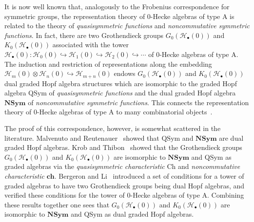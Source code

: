 \documentclass{amsart}
\newtheorem*{Young's Rule}{Young's Rule}
\theoremstyle{definition}
\theoremstyle{remark}
\numberwithin{equation}{section}
\begin{document}
It is now well known that, analogously to the Frobenius correspondence for symmetric groups, the representation theory of 0-Hecke algebras of type A is related to the theory of \emph{quasisymmetric functions} and \emph{noncommutative symmetric functions}. In fact, there are two Grothendieck groups $G_0({\mathcal{H}_\bullet(0)})$ and $K_0({\mathcal{H}_\bullet(0)})$ associated with the tower ${\mathcal{H}_\bullet(0)}: {\mathcal{H}}_0(0)\hookrightarrow {\mathcal{H}}_1(0)\hookrightarrow {\mathcal{H}}_2(0)\hookrightarrow \cdots$ of 0-Hecke algebras of type A. The induction and restriction of representations along the embedding ${\mathcal{H}}_m(0)\otimes{\mathcal{H}}_n(0)\hookrightarrow {\mathcal{H}}_{m+n}(0)$ endows $G_0({\mathcal{H}_\bullet(0)})$ and $K_0({\mathcal{H}_\bullet(0)})$ dual graded Hopf algebra structures which are isomorphic to the graded Hopf algebra ${\mathrm{QSym}}$ of \emph{quasisymmetric functions} and the dual graded Hopf algebra ${\mathbf{NSym}}$ of \emph{noncommutative symmetric functions}. This connects the representation theory of 0-Hecke algebras of type A to many combinatorial objects~\cite{H0CF, H0SR, H0QSchur}.

The proof of this correspondence, however, is somewhat scattered in the literature. Malvenuto and Reutenauer~\cite{MR} showed that ${\mathrm{QSym}}$ and ${\mathbf{NSym}}$ are dual graded Hopf algebras. Krob and Thibon~\cite{KrobThibon} showed that the Grothendieck groups $G_0({\mathcal{H}_\bullet(0)})$ and $K_0({\mathcal{H}_\bullet(0)})$ are isomorphic to ${\mathbf{NSym}}$ and ${\mathrm{QSym}}$ as graded algebras via the \emph{quasisymmetric characteristic} $\mathrm{Ch}$ and \emph{noncommutative characteristic} $\mathbf{ch}$. Bergeron and Li~\cite{BergeronLi} introduced a set of conditions for a tower of graded algebras to have two Grothendieck groups being dual Hopf algebras, and verified these conditions for the tower of $0$-Hecke algebras of type A. Combining these results together one sees that $G_0({\mathcal{H}_\bullet(0)})$ and $K_0({\mathcal{H}_\bullet(0)})$ are isomorphic to ${\mathbf{NSym}}$ and ${\mathrm{QSym}}$ as dual graded Hopf algebras.
\end{document}

